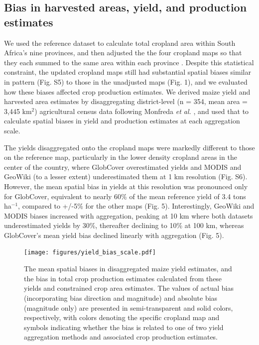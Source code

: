 \documentclass{pnastwo}
\begin{document}
\begin{article}
\subsection{Bias in harvested areas, yield, and production estimates}
We used the reference dataset to calculate total cropland area within South Africa's nine provinces, and then adjusted the the four cropland maps so that they each summed to the same area within each province \cite[per][]{ramankutty_farming_2008}. Despite this statistical constraint, the updated cropland maps still had substantial spatial biases similar in pattern (Fig. S5) to those in the unadjusted maps (Fig. 1), and we evaluated how these biases affected crop production estimates. We derived maize yield and harvested area estimates by disaggregating district-level  (n = 354, mean area = 3,445 km$^2$) agricultural census data \cite{statistics_south_africa_commercial_2007} following Monfreda \emph{et al.} \cite{monfreda_farming_2008}, and used that to calculate spatial biases in yield and production estimates at each aggregation scale. 

The yields disaggregated onto the cropland maps were markedly different to those on the reference map, particularly in the lower density cropland areas in the center of the country, where GlobCover overestimated yields and MODIS and GeoWiki (to a lesser extent) underestimated them at 1 km resolution (Fig. S6). However, the mean spatial bias in yields at this resolution was pronounced only for GlobCover, equivalent to nearly 60\% of the mean reference yield of 3.4 tons ha$^{-1}$, compared to +/-5\% for the other maps (Fig. 5). Interestingly, GeoWiki and MODIS biases increased with aggregation, peaking at 10 km where both datasets underestimated yields by 30\%, thereafter declining to 10\% at 100 km, whereas GlobCover's mean yield bias declined linearly with aggregation (Fig. 5). 

\begin{figure}[!ht]
\centerline{\texttt{[image: figures/yield\_bias\_scale.pdf]}}
\caption{The mean spatial biases in disaggregated maize yield estimates, and the bias in total crop production estimates calculated from these yields and constrained crop area estimates. The values of actual bias (incorporating bias direction and magnitude) and absolute bias (magnitude only) are presented in semi-transparent and solid colors, respectively, with colors denoting the specific cropland map and symbols indicating whether the bias is related to one of two yield aggregation methods and associated crop production estimates.}
\label{afoto}
\end{figure}


\end{article}
\end{document}
